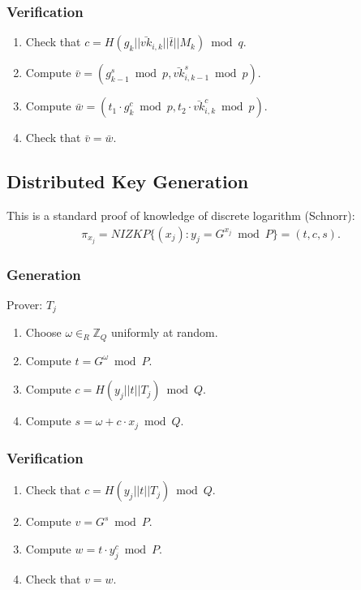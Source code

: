 \documentclass[bibtotoc,halfparskip,oneside]{scrreprt}
\newcommand{\vkbar}[1]{\bar{\mathit{vk}}_{#1}\xspace}
\newcommand{\Tallier}[1]{\ensuremath{\mathit{T}_{#1}}\xspace}
\newcommand{\Mixer}[1]{\ensuremath{\mathit{M}_{#1}}\xspace}
\begin{document}
\subsubsection{Verification}
\begin{enumerate}
	\item Check that $c=H(g_k||\vkbar{i,k}||\bar{t}||\Mixer{k})\bmod{q}$.
	\item Compute $\bar{v}=(g_{k-1}^{s}\bmod{p},\vkbar{i,k-1}^{s}\bmod{p})$.
	\item Compute $\bar{w}=(t_{1}\cdot g_k^{c}\bmod{p},t_{2}\cdot \vkbar{i,k}^{c}\bmod{p})$.
	\item Check that $\bar{v}=\bar{w}$.
\end{enumerate}	

\subsection{Distributed Key Generation}\label{proof_key_gen}

This is a standard proof of knowledge of discrete logarithm (Schnorr):
\begin{align*}
\pi_{x_j}=\mathit{NIZKP}\{(x_j):y_j=G^{x_j}\bmod{P}\}=(t,c,s).
\end{align*}

\subsubsection{Generation}
Prover: $\Tallier{j}$
\begin{enumerate}	
	\item Choose $\omega\in_R\mathbb{Z}_Q$ uniformly at random.
	\item Compute $t=G^{\omega}\bmod{P}$.
	\item Compute $c=H(y_j||t||\Tallier{j})\bmod{Q}$.
	\item Compute $s=\omega + c\cdot x_j \bmod{Q}$.
\end{enumerate}	

\subsubsection{Verification}
\begin{enumerate}
	\item Check that $c=H(y_j||t||\Tallier{j})\bmod{Q}$.
	\item Compute $v=G^{s}\bmod{P}$.
	\item Compute $w=t\cdot y_j^{c}\bmod{P}$.
	\item Check that $v=w$.
\end{enumerate}
\end{document}
